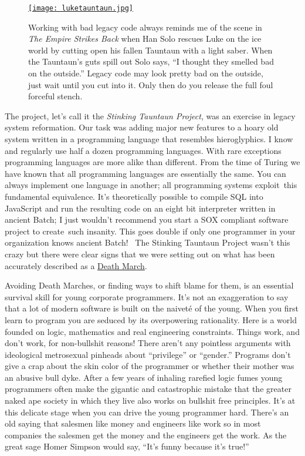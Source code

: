 \captionsetup[figure]{labelformat=empty}
\begin{SCfigure}[20]
\centering
\href{http://starwars.wikia.com/wiki/Tauntaun}{\texttt{[image: luketauntaun.jpg]}}
\caption{Working with bad legacy code always reminds me of the scene in \emph{The
Empire Strikes Back} when Han Solo rescues Luke on the ice world by
cutting open his fallen Tauntaun with a light saber. When the Tauntaun's
guts spill out Solo says, ``I thought they smelled bad on the outside.''
Legacy code may look pretty bad on the outside, just wait until you cut
into it. Only then do you release the full foul forceful
stench.}
\label{fig:4971X0}
\end{SCfigure}


The project, let's call it the \emph{Stinking Tauntaun Project}, was an
exercise in legacy system reformation. Our task was adding major new
features to a hoary old system written in a programming language that
resembles hieroglyphics. I know and regularly use half a dozen
programming languages. With rare exceptions programming languages are
more alike than different. From the time of Turing we have known that
all programming languages are essentially the same. You can always
implement one language in another; all programming systems exploit~this
fundamental equivalence. It's theoretically possible to compile SQL into
JavaScript and run the resulting code on an eight bit interpreter
written in ancient Batch; I just wouldn't recommend you start a SOX
compliant software project to create~such insanity. This goes double if
only one programmer in your organization knows ancient Batch! ~The
Stinking Tauntaun Project wasn't this crazy but there were clear signs
that we were setting out on what has been accurately described as a
\href{http://www.amazon.com/Death-March-Edition-Edward-Yourdon/dp/013143635X}{Death
March}.

Avoiding Death Marches, or finding ways to shift blame for them, is an
essential survival skill for young corporate programmers. It's not an
exaggeration to say that a lot of modern software is built on the
naiveté of the young. When you first learn to program you are seduced by
its overpowering rationality. Here is a world founded on logic,
mathematics and real engineering constraints. Things work, and don't
work, for non-bullshit reasons! There aren't any pointless arguments
with ideological metrosexual pinheads about ``privilege'' or ``gender.''
Programs don't give a crap about the skin color of the programmer or
whether their mother was an abusive bull dyke. After a few years of
inhaling rarefied logic fumes young programmers often make the gigantic
and catastrophic mistake that the greater naked ape society in which
they live also works on bullshit free principles. It's at this delicate
stage when you can drive the young programmer hard. There's an old
saying that salesmen like money and engineers like work so in most
companies the salesmen get the money and the engineers get the work. As
the great sage Homer Simpson would say, ``It's funny because it's
true!''

